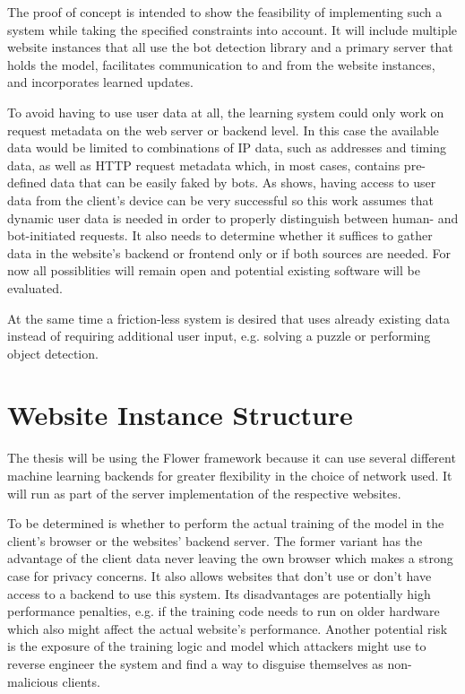 \documentclass[
    fontsize=12pt,
    headings=small,
    parskip=half,           %
    bibliography=totoc,
    numbers=noenddot,       %
    open=any,               %
    final                   %
    ]{scrreprt}
\begin{document}
The proof of concept is intended to show the feasibility of implementing such a system while taking the specified constraints into account. It will include multiple website instances that all use the bot detection library and a primary server that holds the model, facilitates communication to and from the website instances, and incorporates learned updates.

To avoid having to use user data at all, the learning system could only work on request metadata on the web server or backend level. In this case the available data would be limited to combinations of IP data, such as addresses and timing data, as well as HTTP request metadata which, in most cases, contains pre-defined data that can be easily faked by bots. As \cite{PETS2021} shows, having access to user data from the client's device can be very successful so this work assumes that dynamic user data is needed in order to properly distinguish between human- and bot-initiated requests. It also needs to determine whether it suffices to gather data in the website's backend or frontend only or if both sources are needed. For now all possiblities will remain open and potential existing software will be evaluated.

At the same time a friction-less system is desired that uses already existing data instead of requiring additional user input, e.g. solving a puzzle or performing object detection.

\section{Website Instance Structure}

The thesis will be using the Flower framework because it can use several different machine learning backends for greater flexibility in the choice of network used. It will run as part of the server implementation of the respective websites.

To be determined is whether to perform the actual training of the model in the client's browser or the websites' backend server. The former variant has the advantage of the client data never leaving the own browser which makes a strong case for privacy concerns. It also allows websites that don't use or don't have access to a backend to use this system. Its disadvantages are potentially high performance penalties, e.g. if the training code needs to run on older hardware which also might affect the actual website's performance. Another potential risk is the exposure of the training logic and model which attackers might use to reverse engineer the system and find a way to disguise themselves as non-malicious clients.
\end{document}
